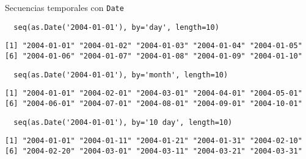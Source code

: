 \documentclass[xcolor={usenames,svgnames,dvipsnames}]{beamer}
\begin{document}
\begin{frame}[fragile,label={sec:org4ac0e7f}]{Secuencias temporales con \texttt{Date}}
 \lstset{language=r,label= ,caption= ,captionpos=b,numbers=none}
\begin{lstlisting}
  seq(as.Date('2004-01-01'), by='day', length=10)
\end{lstlisting}

\begin{verbatim}
[1] "2004-01-01" "2004-01-02" "2004-01-03" "2004-01-04" "2004-01-05"
[6] "2004-01-06" "2004-01-07" "2004-01-08" "2004-01-09" "2004-01-10"
\end{verbatim}

\lstset{language=r,label= ,caption= ,captionpos=b,numbers=none}
\begin{lstlisting}
  seq(as.Date('2004-01-01'), by='month', length=10)
\end{lstlisting}

\begin{verbatim}
[1] "2004-01-01" "2004-02-01" "2004-03-01" "2004-04-01" "2004-05-01"
[6] "2004-06-01" "2004-07-01" "2004-08-01" "2004-09-01" "2004-10-01"
\end{verbatim}

\lstset{language=r,label= ,caption= ,captionpos=b,numbers=none}
\begin{lstlisting}
  seq(as.Date('2004-01-01'), by='10 day', length=10)
\end{lstlisting}

\begin{verbatim}
[1] "2004-01-01" "2004-01-11" "2004-01-21" "2004-01-31" "2004-02-10"
[6] "2004-02-20" "2004-03-01" "2004-03-11" "2004-03-21" "2004-03-31"
\end{verbatim}
\end{frame}
\end{document}
